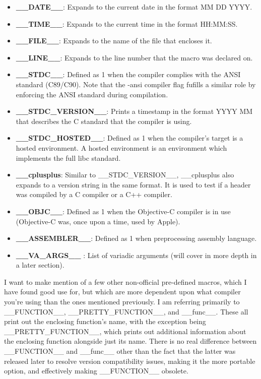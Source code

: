 \documentclass{article}
\begin{document}
\begin{itemize}

\item{%
    \textbf{\_\_DATE\_\_}: Expands to the current date in the format MM DD YYYY.
}

\item{%
    \textbf{\_\_TIME\_\_}: Expands to the current time in the format HH:MM:SS.
}

\item{%
    \textbf{\_\_FILE\_\_}: Expands to the name of the file that encloses it.
}

\item{%
    \textbf{\_\_LINE\_\_}: Expands to the line number that the macro was declared on.
}

\item{%
    \textbf{\_\_STDC\_\_}: Defined as 1 when the compiler complies with the ANSI standard (C89/C90). Note that
    the -ansi compiler flag fufills a similar role by enforcing the ANSI standard during compilation.
}

\item{%
    \textbf{\_\_STDC\_VERSION\_\_}: Prints a timestamp in the format YYYY MM that describes the C standard that
    the compiler is using.
}

\item{%
    \textbf{\_\_STDC\_HOSTED\_\_}: Defined as 1 when the compiler's target is a hosted environment. A hosted
    environment is an environment which implements the full libc standard.
}

\item{%
    \textbf{\_\_cplusplus}: Similar to \_\_STDC\_VERSION\_\_, \_\_cplusplus also expands to a version string
    in the same format. It is used to test if a header was compiled by a C compiler or a C++ compiler.
}

\item{%
    \textbf{\_\_OBJC\_\_}: Defined as 1 when the Objective-C compiler is in use (Objective-C was, once upon a
    time, used by Apple).
}

\item{%
    \textbf{\_\_ASSEMBLER\_\_}: Defined as 1 when preprocessing assembly language.
}

\item{%
    \textbf{\_\_VA\_ARGS\_\_ }: List of variadic arguments (will cover in more depth in a later section).
}

\end{itemize}

I want to make mention of a few other non-official pre-defined macros, which I have found good use for, but
which are more dependent upon what compiler you're using than the ones mentioned previously. I am referring
primarily to \_\_FUNCTION\_\_, \_\_PRETTY\_FUNCTION\_\_, and \_\_func\_\_. These all print out the enclosing
function's name, with the exception being \_\_PRETTY\_FUNCTION\_\_, which prints out additional information
about the enclosing function alongside just its name. There is no real difference between \_\_FUNCTION\_\_ and
\_\_func\_\_ other than the fact that the latter was released later to resolve version compatibility issues,
making it the more portable option, and effectively making \_\_FUNCTION\_\_ obsolete.
\end{document}
